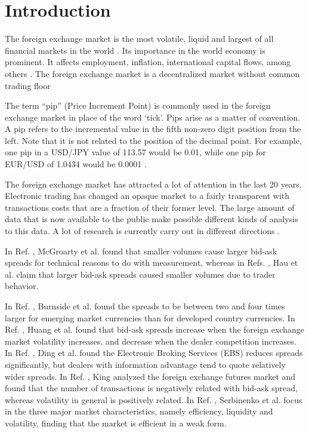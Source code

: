 \section{Introduction}\label{sec:introduction}

The foreign exchange market is the most volatile, liquid and largest of all
financial markets in the world
\cite{forex_liquidity,info_forex,intraday_forex}. Its importance in the world
economy is prominent. It affects employment, inflation, international capital
flows, among others \cite{forex_structure}. The foreign exchange market is a
decentralized market without common trading floor
\cite{forex_structure,info_forex,teach_spread}

The term ``pip'' (Price Increment Point) is commonly used in the foreign
exchange market in place of the word ‘tick’. Pips arise as a matter of
convention. A pip refers to the incremental value in the fifth non-zero digit
position from the left. Note that it is not related to the position of the
decimal point. For example, one pip in a USD/JPY value of 113.57 would be 0.01,
while one pip for EUR/USD of 1.0434 would be 0.0001
\cite{micro_eff,forex_structure}.

The foreign exchange market has attracted a lot of attention in the last 20
years. Electronic trading has changed an opaque market to a fairly transparent
with transactions costs that are a fraction of their former level. The large
amount of data that is now available to the public make possible different
kinds of analysis to this data. A lot of research is currently carry out in
different directions
\cite{curr_speculation,forex_algorithmic,forex_inefficiency,forex_structure,electronic_forex,eur_change_forex,info_forex,intraday_forex,patterns_forex,teach_spread,spread_competition,political_forex,forex_microstructure,forex_volatility,forex_liquidity}.

In Ref. \cite{micro_eff}, McGroarty et al. found that smaller volumes cause
larger bid-ask spreads for technical reasons to do with measurement, whereas in
Refs. \cite{eur_int_curr,eur_change_forex}, Hau et al. claim that larger
bid-ask spreads caused smaller volumes due to trader behavior.

In Ref. \cite{curr_speculation}, Burnside et al. found the spreads to be
between two and four times larger for emerging market currencies than for
developed country currencies. In Ref. \cite{spread_competition}, Huang et al.
found that bid-ask spreads increase when the foreign exchange market volatility
increases, and decrease when the dealer competition increases. In Ref.
\cite{electronic_forex}, Ding et al. found the Electronic Broking Services
(EBS) reduces spreads significantly, but dealers with information advantage
tend to quote relatively wider spreads. In Ref. \cite{spread_futures}, King
analyzed the foreign exchange futures market and found that the number of
transactions is negatively related with bid-ask spread, whereas volatility in
general is positively related. In Ref. \cite{intraday_forex}, Serbinenko et al.
focus in the three major market characteristics, namely efficiency, liquidity
and volatility, finding that the market is efficient in a weak form.


